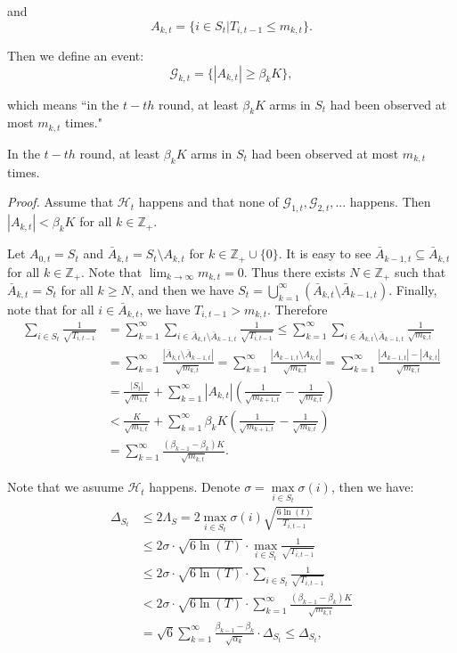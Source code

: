 \documentclass[opre,sglanonrev]{informs4}
\begin{document}
and 
$$ A_{k,t} = \{i \in S_t|T_{i,t-1}\leq m_{k,t}\}.$$

Then we define an event:
$$\mathcal{G}_{k,t}=\{|A_{k,t}|\geq\beta_kK\},$$

which means “in the $t-th$ round, at least $\beta_{k}K$ arms in $S_{t}$ had been observed at most $m_{k,t}$ times."

\begin{lemma}
In the $t-th$ round, at least $\beta_{k}K$ arms in $S_t$ had been observed at most $m_{k,t}$ times.
\end{lemma}

\textit{Proof.} Assume that $\mathcal{H}_t$ happens and that none of $\mathcal{G}_{1,t},\mathcal{G}_{2,t},...$ happens. Then $|A_{k,t}|<\beta_{k}K$ for all $k\in \mathbb{Z}_+$.

Let $A_{0,t} = S_t$ and $\bar{A}_{k,t}=S_t\setminus A_{k,t}$ for $k\in \mathbb{Z}_+\cup \{0\}$. It is easy to see $\bar{A}_{k-1,t}\subseteq\bar{A}_{k,t}$ for all $k\in \mathbb{Z}_+$. Note that $\lim_{k \to \infty}m_{k,t}=0$. Thus there exists $N\in \mathbb{Z}_+$ such that $\bar{A}_{k,t}=S_t$ for all $k\geq N$, and then we have $S_t=\bigcup_{k=1}^\infty\left(\bar{A}_{k,t}\setminus\bar{A}_{k-1,t}\right)$. Finally, note that for all $i\in \bar{A}_{k,t}$, we have $T_{i,t-1}>m_{k,t}$. Therefore
$$\begin{aligned}
\sum_{i\in S_t}\frac{1}{\sqrt{T_{i,t-1}}} & =\sum_{k=1}^\infty\sum_{i\in\bar{A}_{k,t}\setminus\bar{A}_{k-1,t}}\frac{1}{\sqrt{T_{i,t-1}}}\leq\sum_{k=1}^\infty\sum_{i\in\bar{A}_{k,t}\setminus\bar{A}_{k-1,t}}\frac{1}{\sqrt{m_{k,t}}} \\
 & =\sum_{k=1}^\infty\frac{\left|\bar{A}_{k,t}\setminus\bar{A}_{k-1,t}\right|}{\sqrt{m_{k,t}}}=\sum_{k=1}^\infty\frac{\left|A_{k-1,t}\setminus A_{k,t}\right|}{\sqrt{m_{k,t}}}=\sum_{k=1}^\infty\frac{\left|A_{k-1,t}\right|-\left|A_{k,t}\right|}{\sqrt{m_{k,t}}} \\
 & =\frac{|S_t|}{\sqrt{m_{1,t}}}+\sum_{k=1}^\infty|A_{k,t}|\left(\frac{1}{\sqrt{m_{k+1,t}}}-\frac{1}{\sqrt{m_{k,t}}}\right) \\
 & <\frac{K}{\sqrt{m_{1,t}}}+\sum_{k=1}^\infty\beta_kK\left(\frac{1}{\sqrt{m_{k+1,t}}}-\frac{1}{\sqrt{m_{k,t}}}\right) \\
 & =\sum_{k=1}^\infty\frac{(\beta_{k-1}-\beta_k)K}{\sqrt{m_{k,t}}}.
\end{aligned}$$

Note that we asuume $\mathcal{H}_t$ happens. Denote $\sigma = \mathop{\max}\limits_{i\in S_t}\sigma(i)$, then we have: 
$$\begin{aligned}
\Delta_{S_t} & \leq 2\Lambda_S=2\mathop{\max}\limits_{i\in S_t}\sigma(i)\sqrt{\frac{6\ln(t)}{T_{i,t-1}}}\\
&\leq 2\sigma \cdot \sqrt{6\ln(T)}\cdot \mathop{\max}\limits_{i\in S_t}\frac{1}{\sqrt{T_{i,t-1}}}\\
&\leq 2\sigma \cdot \sqrt{6\ln(T)}\cdot \sum_{i\in S_t}\frac{1}{\sqrt{T_{i,t-1}}}\\
&<2\sigma \cdot \sqrt{6\ln(T)}\cdot \sum_{k=1}^\infty\frac{(\beta_{k-1}-\beta_k)K}{\sqrt{m_{k,t}}}\\
&=\sqrt{6}\sum_{k=1}^\infty\frac{\beta_{k-1}-\beta_k}{\sqrt{\alpha_k}}\cdot \Delta_{S_t}\leq\Delta_{S_t},
\end{aligned}$$
\end{document}
